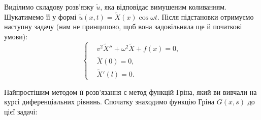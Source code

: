 Виділимо складову розв'язку $\tilde{u}$, яка відповідає вимушеним коливанням. Шукатимемо її у формі $\tilde{u}(x,t) = \widetilde{X}(x) \cos\omega t$. Після підстановки отримуємо наступну задачу (нам не принципово, щоб вона задовільняла ще й початкові умови):
\begin{equation} 
    \left\{ \begin{aligned} 
        &v^2\widetilde{X}'' + \omega^2\widetilde{X} + f(x) = 0,\\
        &\widetilde{X}(0)=0,\\
        &\widetilde{X}'(l)=0.
    \end{aligned} \right.
\end{equation}

Найпростішим методом її розв'язання є метод функцій Гріна, який ви вивчали на курсі диференціальних рівнянь. Спочатку знаходимо функцію Гріна $G(x,s)$ до цієї задачі:

